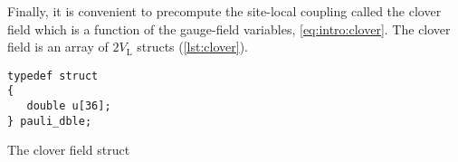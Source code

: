 Finally, it is convenient to precompute the site-local coupling called the clover field which is a function of the gauge-field variables, \cref{eq:intro:clover}.
The clover field is an array of $2V_\mathrm{L}$  structs (\cref{lst:clover}).
\begin{codelisting}
\begin{verbatim}
typedef struct
{
   double u[36];
} pauli_dble;
\end{verbatim}
\caption{The clover field struct}
\label{lst:clover}
\end{codelisting}

